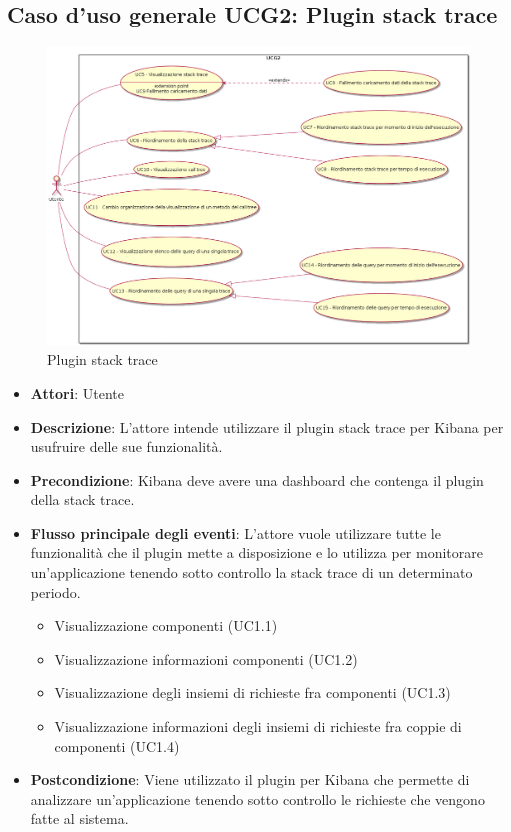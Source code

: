 \subsection{Caso d'uso generale  UCG2: Plugin stack trace}
\begin{figure} [H]
	\centering
	\includegraphics[scale=0.37]{./UC/UCG2.png}
	\caption{Plugin stack trace}\label{}
\end{figure}
\begin{itemize}
	\item \textbf{Attori}: Utente
	\item \textbf{Descrizione}: L'attore intende utilizzare il plugin stack trace per Kibana per usufruire delle sue funzionalità.
	\item \textbf{Precondizione}: Kibana deve avere una dashboard che contenga il plugin della stack trace.
	\item \textbf{Flusso principale degli eventi}: 
	L'attore vuole utilizzare tutte le funzionalità che il plugin mette a disposizione e lo utilizza per monitorare un'applicazione tenendo sotto controllo la stack trace di un determinato periodo.
	\begin{itemize}
		\item Visualizzazione componenti (UC1.1)
		\item Visualizzazione informazioni componenti (UC1.2)
		\item Visualizzazione degli insiemi di richieste fra componenti (UC1.3)
		\item Visualizzazione informazioni degli insiemi di richieste fra coppie di componenti (UC1.4)
	\end{itemize}
	\item \textbf{Postcondizione}: Viene utilizzato il plugin per Kibana che permette di analizzare un'applicazione tenendo sotto controllo le richieste che vengono fatte al sistema.
\end{itemize}

